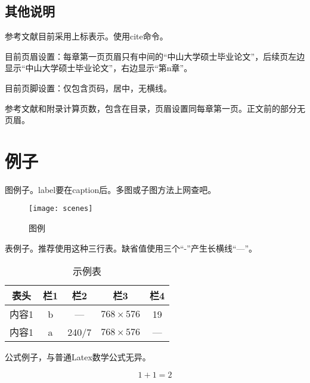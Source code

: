 \subsection{其他说明}
\label{sec:setting}

参考文献\cite{wu2013online}目前采用上标表示。使用cite命令。

目前页眉设置：每章第一页页眉只有中间的“中山大学硕士毕业论文”，后续页左边显示“中山大学硕士毕业论文”，右边显示“第n章”。

目前页脚设置：仅包含页码，居中，无横线。

参考文献和附录计算页数，包含在目录，页眉设置同每章第一页。正文前的部分无页眉。

\section{例子}
\label{sec:examples}

图例子。label要在caption后。多图或子图方法上网查吧。

\begin{figure}[!t]
	\centering
	\texttt{[image: scenes]}
	\caption{图例}
	\label{fig:scenes}
\end{figure}

表例子。推荐使用这种三行表。缺省值使用三个“-”产生长横线“---”。

\begin{table}[!t]
\caption{示例表}
\label{tab:eg}
\vspace{0.5em}
\centering
\wuhao
	\begin{tabular}{ccccc}
	\toprule[1.5pt]
	表头 & 栏1 & 栏2 & 栏3 & 栏4 \\
	\midrule[1pt]
	内容1 & b & --- & $768 \times 576$ & 19 \\
	内容1 & a & 240/7 & $768 \times 576$ & --- \\
	\bottomrule[1.5pt]
	\end{tabular}
\end{table}

公式例子，与普通Latex数学公式无异。

\begin{equation}
1+1=2
\end{equation}

